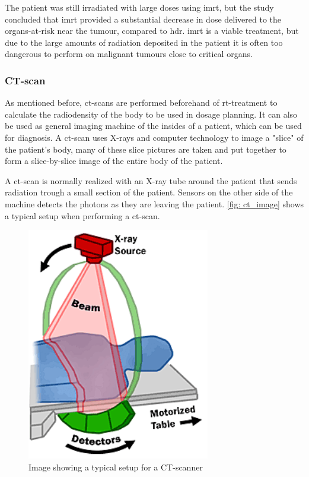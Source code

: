 \documentclass[main.tex]{subfiles}
\begin{document}
The patient was still irradiated with large doses using \gls{imrt}, but the study concluded that \gls{imrt} provided a substantial decrease in dose delivered to the organs-at-risk near the tumour, compared to \gls{hdr}. \gls{imrt} is a viable treatment, but due to the large amounts of radiation deposited in the patient it is often too dangerous to perform on malignant tumours close to critical organs.

\subsubsection{CT-scan}
As mentioned before, \gls{ct}-scans are performed beforehand of \gls{rt}-treatment to calculate the radiodensity of the body to be used in dosage planning. It can also be used as general imaging machine of the insides of a patient, which can be used for diagnosis. A \gls{ct}-scan uses X-rays and computer technology to image a "slice" of the patient's body, many of these slice pictures are taken and put together to form a slice-by-slice image of the entire body of the patient.

A \gls{ct}-scan is normally realized with an X-ray tube around the patient that sends radiation trough a small section of the patient. Sensors on the other side of the machine detects the photons as they are leaving the patient. \autoref{fig: ct_image} shows a typical setup when performing a \gls{ct}-scan.

 \begin{figure}[!htpb]
    \centering
    \includegraphics[width=8cm ]{images/CTXRAYScan.png}
    \caption{Image showing a typical setup for a CT-scanner\cite{CTimage}}
    \label{fig: ct_image}
\end{figure}
\FloatBarrier 
\end{document}
